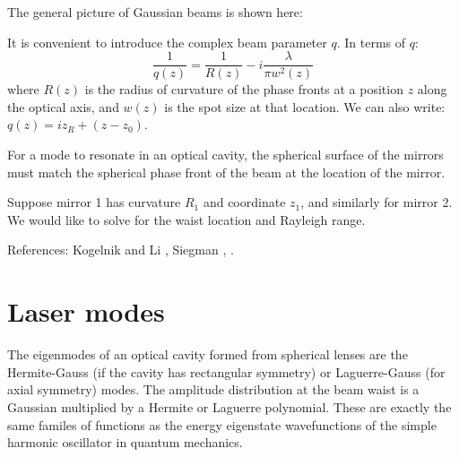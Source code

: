 The general picture of Gaussian beams is shown here:

It is convenient to introduce the complex beam parameter $q$.  In terms of $q$:
\begin{equation}
\frac{1}{q(z)} = \frac{1}{R(z)} - i \frac{\lambda}{\pi w^2(z)}
\end{equation}
where $R(z)$ is the radius of curvature of the phase fronts at a
position $z$ along the optical axis, and $w(z)$ is the spot size at
that location.  We can also write:
$q(z) = i z_R + (z - z_0)$.

For a mode to resonate in an optical cavity, the spherical surface of
the mirrors must match the spherical phase front of the beam at the
location of the mirror.

Suppose mirror 1 has curvature $R_1$ and coordinate $z_1$, and
similarly for mirror 2.  We would like to solve for the waist location
and Rayleigh range.

References: Kogelnik and Li \cite{Kogelnik1966Laser}, Siegman \cite{Siegman1990Lasers}, \cite{Rudiger1998Phase,Fox1961Resonant}.

\section{Laser modes}

The eigenmodes of an optical cavity formed from spherical lenses are
the Hermite-Gauss (if the cavity has rectangular symmetry) or
Laguerre-Gauss (for axial symmetry) modes.  The amplitude distribution
at the beam waist is a Gaussian multiplied by a Hermite or Laguerre
polynomial.  These are exactly the same familes of functions as the
energy eigenstate wavefunctions of the simple harmonic oscillator in
quantum mechanics.

